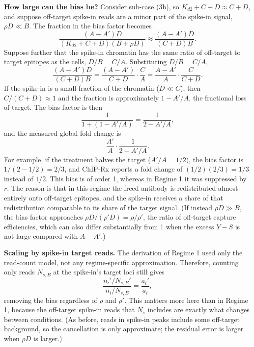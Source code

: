\textbf{How large can the bias be?} Consider sub-case (3b), so
$K_{d2}+C+D\approx C+D$, and suppose off-target spike-in reads are a
minor part of the spike-in signal, $\rho D\ll B$. The fraction in the
bias factor becomes
$$
\frac{(A-A')D}{(K_{d2}+C+D)(B+\rho D)}
\approx\frac{(A-A')D}{(C+D)B}.
$$
Suppose further that the spike-in chromatin has the same ratio of
off-target to target epitopes as the cells, $D/B=C/A$. Substituting
$D/B=C/A$,
$$
\frac{(A-A')D}{(C+D)B}
=\frac{(A-A')}{C+D}\cdot\frac{C}{A}
=\frac{A-A'}{A}\cdot\frac{C}{C+D}.
$$
If the spike-in is a small fraction of the chromatin ($D\ll C$), then
$C/(C+D)\approx1$ and the fraction is approximately $1-A'/A$, the
fractional loss of target. The bias factor is then
$$
\frac{1}{1+(1-A'/A)}=\frac{1}{2-A'/A},
$$
and the measured global fold change is
$$
\frac{A'}{A}\cdot\frac{1}{2-A'/A}.
$$
For example, if the treatment halves the target ($A'/A=1/2$), the bias
factor is $1/(2-1/2)=2/3$, and ChIP-Rx reports a fold change of
$(1/2)(2/3)=1/3$ instead of $1/2$. This bias is of order 1, whereas in
Regime 1 it was suppressed by $r$. The reason is that in this regime the
freed antibody is redistributed almost entirely onto off-target
epitopes, and the spike-in receives a share of that redistribution
comparable to its share of the target signal. (If instead $\rho D\gg B$,
the bias factor approaches $\rho D/(\rho' D)=\rho/\rho'$, the ratio of
off-target capture efficiencies, which can also differ substantially
from 1 when the excess $Y-S$ is not large compared with $A-A'$.)

\textbf{Scaling by spike-in target reads.} The derivation of Regime 1
used only the read-count model, not any regime-specific approximation.
Therefore, counting only reads $N_{s,B}$ at the spike-in's target loci
still gives
$$
\frac{n_i'/N_{s,B}'}{n_i/N_{s,B}}=\frac{a_i'}{a_i},
$$
removing the bias regardless of $\rho$ and $\rho'$. This matters more
here than in Regime 1, because the off-target spike-in reads that
$N_s$ includes are exactly what changes between conditions. (As before,
reads in spike-in peaks include some off-target background, so the
cancellation is only approximate; the residual error is larger when
$\rho D$ is larger.)
